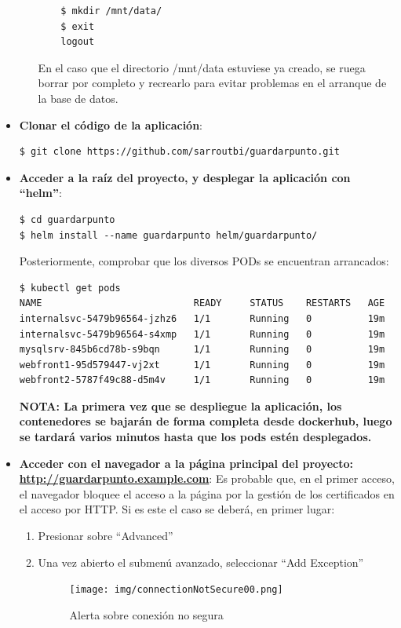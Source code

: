\documentclass[12pt,spanish]{article}
\begin{document}
\begin{itemize}
\begin{itemize}
\begin{verbatim}
    $ mkdir /mnt/data/
    $ exit
    logout
  \end{verbatim}
  En el caso que el directorio /mnt/data estuviese ya creado, se ruega borrar por completo y recrearlo para evitar problemas en el arranque de la base de datos.
  \end{itemize}
\item{\textbf{Clonar el código de la aplicación}}:
\begin{verbatim}
$ git clone https://github.com/sarroutbi/guardarpunto.git
\end{verbatim}
\item{\textbf{Acceder a la raíz del proyecto, y desplegar la aplicación con ``helm''}}:
\begin{verbatim}
$ cd guardarpunto
$ helm install --name guardarpunto helm/guardarpunto/
\end{verbatim}
Posteriormente, comprobar que los diversos PODs se encuentran arrancados:
\begin{verbatim}
$ kubectl get pods
NAME                           READY     STATUS    RESTARTS   AGE
internalsvc-5479b96564-jzhz6   1/1       Running   0          19m
internalsvc-5479b96564-s4xmp   1/1       Running   0          19m
mysqlsrv-845b6cd78b-s9bqn      1/1       Running   0          19m
webfront1-95d579447-vj2xt      1/1       Running   0          19m
webfront2-5787f49c88-d5m4v     1/1       Running   0          19m
\end{verbatim}
\textbf{NOTA: La primera vez que se despliegue la aplicación, los contenedores se bajarán de forma completa desde dockerhub, luego se tardará varios minutos hasta que los pods estén desplegados.}
\item{\textbf{Acceder con el navegador a la página principal del proyecto: \url{http://guardarpunto.example.com}}}:
Es probable que, en el primer acceso, el navegador bloquee el acceso a la página por la gestión de los certificados en el acceso por HTTP. Si es este el caso se deberá, en primer lugar:
\begin{enumerate}
\item{Presionar sobre ``Advanced''}
\item{Una vez abierto el submenú avanzado, seleccionar ``Add Exception''}
\begin{center}
 \begin{figure}[H]
 \begin{center}
   \texttt{[image: img/connectionNotSecure00.png]}
   \caption{Alerta sobre conexión no segura}
   \label{fig:connectionNotSecure00}
 \end{center}

\end{figure}
\end{center}
\end{enumerate}
\end{itemize}
\end{document}
